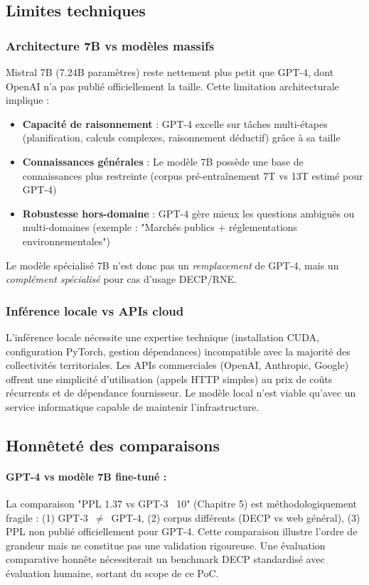 \subsection{Limites techniques}

\subsubsection{Architecture 7B vs modèles massifs}

Mistral 7B (7.24B paramètres) reste nettement plus petit que GPT-4, dont OpenAI n'a pas publié officiellement la taille. Cette limitation architecturale implique :
\begin{itemize}
    \item \textbf{Capacité de raisonnement} : GPT-4 excelle sur tâches multi-étapes (planification, calculs complexes, raisonnement déductif) grâce à sa taille
    \item \textbf{Connaissances générales} : Le modèle 7B possède une base de connaissances plus restreinte (corpus pré-entraînement 7T vs 13T estimé pour GPT-4)
    \item \textbf{Robustesse hors-domaine} : GPT-4 gère mieux les questions ambiguës ou multi-domaines (exemple : "Marchés publics + réglementations environnementales")
\end{itemize}

Le modèle spécialisé 7B n'est donc pas un \textit{remplacement} de GPT-4, mais un \textit{complément spécialisé} pour cas d'usage DECP/RNE.

\subsubsection{Inférence locale vs APIs cloud}

L'inférence locale nécessite une expertise technique (installation CUDA, configuration PyTorch, gestion dépendances) incompatible avec la majorité des collectivités territoriales. Les APIs commerciales (OpenAI, Anthropic, Google) offrent une simplicité d'utilisation (appels HTTP simples) au prix de coûts récurrents et de dépendance fournisseur. Le modèle local n'est viable qu'avec un service informatique capable de maintenir l'infrastructure.

\subsection{Honnêteté des comparaisons}

\paragraph{GPT-4 vs modèle 7B fine-tuné :}
La comparaison "PPL 1.37 vs GPT-3 ~10" (Chapitre 5) est méthodologiquement fragile : (1) GPT-3~$\neq$~GPT-4, (2) corpus différents (DECP vs web général), (3) PPL non publié officiellement pour GPT-4. Cette comparaison illustre l'ordre de grandeur mais ne constitue pas une validation rigoureuse. Une évaluation comparative honnête nécessiterait un benchmark DECP standardisé avec évaluation humaine, sortant du scope de ce PoC.

